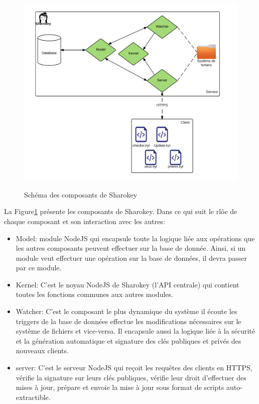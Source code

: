 \documentclass{themeensg}
\begin{document}
\begin{figure}[h!]
\centering
\includegraphics[scale=0.8]{images/composants.png}
\label{fig:composants}
\caption{Schéma des composants de Sharokey}
\end{figure}

La Figure\ref{fig:composants} présente les composants de Sharokey. Dans ce qui suit le rlôe de chaque composant et son interaction avec les autres:

\begin{itemize}
\item Model: module NodeJS qui encapsule toute la logique liée aux opérations que les autres composants peuvent effectuer sur la base de donnée. Ainsi, si un module veut effectuer une opération sur la base de données, il devra passer par ce module.
\item Kernel: C'est le noyau NodeJS de Sharokey (l'API centrale) qui contient toutes les fonctions communes aux autres modules.
\item Watcher: C'est le composant le plus dynamique du système il écoute les triggers de la base de données effectue les modifications nécessaires sur le système de fichiers et vice-versa. Il encapsule aussi la logique liée à la sécurité et la génération automatique et signature des clés publiques et privés des nouveaux clients.
\item server: C'est le serveur NodeJS qui reçoit les requêtes des clients en HTTPS, vérifie la signature sur leurs clés publiques, vérifie leur droit d'effectuer des mises à jour, prépare et envoie la mise à jour sous format de scripts auto-extractible.
\end{itemize}
\end{document}

